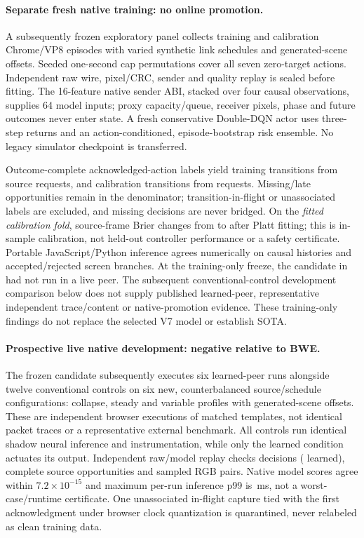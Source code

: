 \documentclass[10pt]{article}
\begin{document}
\paragraph{Separate fresh native training: no online promotion.}
A subsequently frozen exploratory panel collects \NativeTrainEpisodes{} training and \NativeCalibrationEpisodes{} calibration Chrome/VP8 episodes with varied synthetic link schedules and generated-scene offsets. Seeded one-second cap permutations cover all seven zero-target actions. Independent raw wire, pixel/CRC, sender and quality replay is sealed before fitting. The 16-feature native sender ABI, stacked over four causal observations, supplies 64 model inputs; proxy capacity/queue, receiver pixels, phase and future outcomes never enter state. A fresh conservative Double-DQN actor uses three-step returns and an action-conditioned, episode-bootstrap risk ensemble. No legacy simulator checkpoint is transferred.

Outcome-complete acknowledged-action labels yield \NativeTrainTransitions{} training transitions from \NativeTrainRequests{} source requests, and \NativeCalibrationTransitions{} calibration transitions from \NativeCalibrationRequests{} requests. Missing/late opportunities remain in the denominator; transition-in-flight or unassociated labels are excluded, and missing decisions are never bridged. On the \emph{fitted calibration fold}, source-frame Brier changes from \NativeRawBrier{} to \NativePlattBrier{} after Platt fitting; this is in-sample calibration, not held-out controller performance or a safety certificate. Portable JavaScript/Python inference agrees numerically on causal histories and accepted/rejected screen branches. At the training-only freeze, the candidate in  had not run in a live peer. The subsequent conventional-control development comparison below does not supply published learned-peer, representative independent trace/content or native-promotion evidence. These training-only findings do not replace the selected V7 model or establish SOTA.
\paragraph{Prospective live native development: negative relative to BWE.}
The frozen candidate subsequently executes six learned-peer runs alongside twelve conventional controls on six new, counterbalanced source/schedule configurations: collapse, steady and variable profiles with generated-scene offsets. These are independent browser executions of matched templates, not identical packet traces or a representative external benchmark. All controls run identical shadow neural inference and instrumentation, while only the learned condition actuates its output. Independent raw/model replay checks \NativeLiveDecisions{} decisions (\NativeLearnedDecisions{} learned), \NativeLiveRequests{} complete source opportunities and \NativeLiveQualityPairs{} sampled RGB pairs. Native model scores agree within $7.2\times10^{-15}$ and maximum per-run inference p99 is \NativeLiveInferenceTail{}\,ms, not a worst-case/runtime certificate. One unassociated in-flight capture tied with the first acknowledgment under browser clock quantization is quarantined, never relabeled as clean training data.
\end{document}
